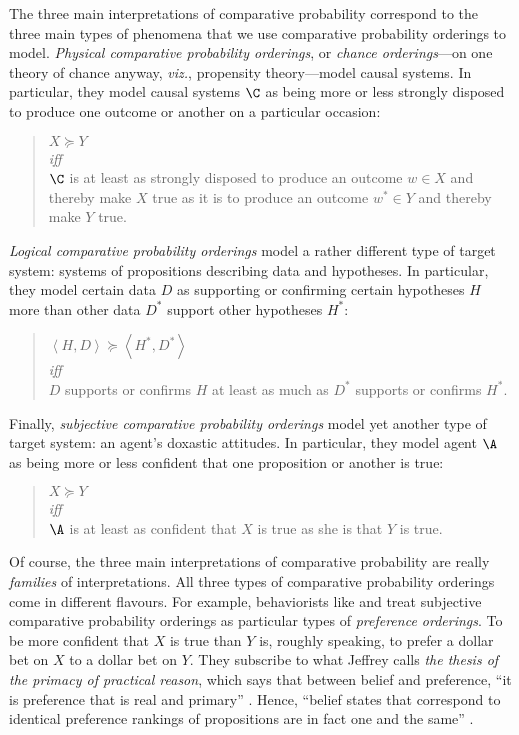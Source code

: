 The three main interpretations of comparative probability correspond to the three main types of phenomena that we use comparative probability orderings to model. \emph{Physical comparative probability orderings}, or \emph{chance orderings}---on one theory of chance anyway, \textit{viz.}, propensity theory---model causal systems. In particular, they model causal systems $\C$ as being more or less strongly disposed to produce one outcome or another on a particular occasion:
\begin{quote}
{\centering $X\succeq Y$\\
\textit{iff}\\}
$\C$ is at least as strongly disposed to produce an outcome $w\in X$ and thereby make $X$ true as it is to produce an outcome $w^*\in Y$ and thereby make $Y$ true.
\end{quote}
\emph{Logical comparative probability orderings} model a rather different type of target system: systems of propositions describing data and hypotheses. In particular, they model certain data $D$ as supporting or confirming certain hypotheses $H$ more than other data $D^*$ support other hypotheses $H^*$:
\begin{quote}
{\centering
$\left<H,D\right>\succeq \left<H^*,D^*\right>$\\
\textit{iff}\\}
$D$ supports or confirms $H$ at least as much as $D^*$ supports or confirms $H^*$.
\end{quote}
Finally, \emph{subjective comparative probability orderings} model yet another type of target system: an agent's doxastic attitudes. In particular, they model agent $\A$ as being more or less confident that one proposition or another is true:
\begin{quote}
{\centering
$X\succeq Y$\\
\textit{iff}\\}
$\A$ is at least as confident that $X$ is true as she is that $Y$ is true.
\end{quote}

Of course, the three main interpretations of comparative probability are really \emph{families} of interpretations. All three types of comparative probability orderings come in different flavours. For example, behaviorists like \citet{deFinetti1931, deFinetti1964} and \citet{Savage1954} treat subjective comparative probability orderings as particular types of \emph{preference orderings}. To be more confident that $X$ is true than $Y$ is, roughly speaking, to prefer a dollar bet on $X$ to a dollar bet on $Y$. They subscribe to what Jeffrey calls \emph{the thesis of the primacy of practical reason}, which says that between belief and preference, ``it is preference that is real and primary'' \citep[p. 590]{Jeffrey1987}. Hence, ``belief states that correspond to identical preference rankings of propositions are in fact one and the same'' \citep[p. 138]{Jeffrey1983}.


